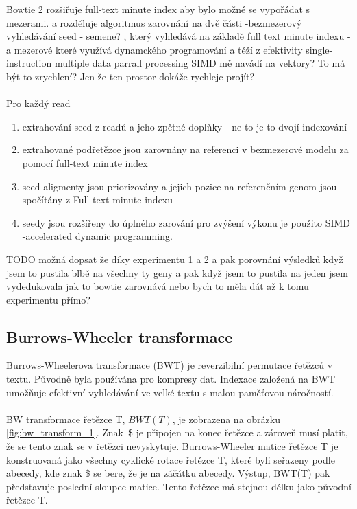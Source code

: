 \documentclass[czech,DP]{thesiskiv}
\numberwithin{equation}{section}
\begin{document}
Bowtie 2 rozšiřuje full-text minute index aby bylo možné se vypořádat s mezerami.
a rozděluje algoritmus zarovnání na dvě části
-bezmezerový vyhledávání seed - semene? , který vyhledává na základě full text minute indexu
- a mezerové které využívá dynamckého programování a těží z efektivity single- instruction multiple data parrall processing
 SIMD mě navádí na vektory? To má být to zrychlení? Jen že ten prostor dokáže rychlejc projít?
\\
\\
Pro každý read
\begin{enumerate}
	\item extrahování seed z readů a jeho zpětné doplňky - ne to je to dvojí indexování
	\item extrahované podřetězce jsou zarovnány na referenci v bezmezerové modelu za pomocí full-text minute index
	\item seed aligmenty jsou priorizovány a jejich pozice na referenčním genom jsou spočítány z Full text minute indexu
	\item seedy jsou rozšířeny do úplného zarování pro zvýšení výkonu je použito SIMD -accelerated dynamic programming.
\end{enumerate}

TODO možná dopsat že díky experimentu 1 a 2 a pak porovnání výsledků když jsem to pustila blbě na všechny ty geny a pak když jsem to pustila na jeden jsem vydedukovala jak to bowtie zarovnává nebo bych to měla dát až k tomu experimentu přímo? 

\subsection{Burrows-Wheeler transformace}
Burrows-Wheelerova transformace (BWT) je reverzibilní permutace řetězců v textu. Původně byla používána pro kompresy dat. Indexace založená na BWT umožňuje efektivní vyhledávání ve velké textu s malou paměťovou náročností. 
\\
\\
BW transformace řetězce T, $BWT(T)$, je zobrazena na obrázku \ref{fig:bw_transform_1}. Znak~\$ je připojen na konec řetězce a zároveň musí platit, že se tento znak se v řetězci nevyskytuje. Burrows-Wheeler matice řetězce T je konstruovaná jako všechny cyklické rotace řetězce T, které byli seřazeny podle abecedy, kde znak \$ se bere, že je na záčátku abecedy. Výstup, BWT(T) pak představuje poslední sloupec matice. Tento řetězec má stejnou délku jako původní řetězec T. \cite{bowtie} 
\end{document}
